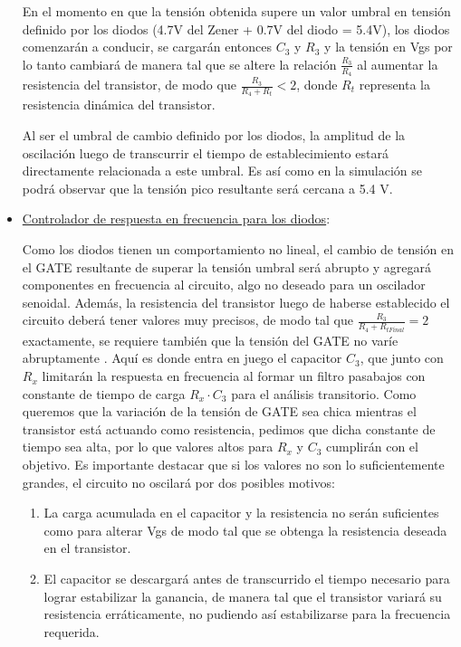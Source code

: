 \documentclass[../../tc_tp6_main.tex]{subfiles}
\begin{document}
\begin{itemize}
En el momento en que la tensión obtenida supere un valor umbral en tensión definido por los diodos (4.7V del Zener + 0.7V del diodo = 5.4V), los diodos comenzarán a conducir, se cargarán entonces $C_3$ y $R_3$ y la tensión en Vgs por lo tanto cambiará de manera tal que se altere la relación  $\frac{R_3}{R_4}$ al aumentar la resistencia del transistor, de modo que $\frac{R_3}{R_4+R_t}<2$, donde $R_t$ representa la resistencia dinámica del transistor.\par
Al ser el umbral de cambio definido por los diodos, la amplitud de la oscilación luego de transcurrir el tiempo de establecimiento estará directamente relacionada a este umbral. Es así como en la simulación se podrá observar que la tensión pico resultante será cercana a 5.4 V.\par

\item \underline{Controlador de respuesta en frecuencia para los diodos}:\par
Como los diodos tienen un comportamiento no lineal, el cambio de tensión en el GATE resultante de superar la tensión umbral será abrupto y agregará componentes en frecuencia al circuito, algo no deseado para un oscilador senoidal. Además, la resistencia del transistor luego de haberse establecido el circuito deberá tener valores muy precisos, de modo tal que $\frac{R_3}{R_4+R_{tFinal}}=2$ exactamente, se requiere también que la tensión del GATE no varíe abruptamente . Aquí es donde entra en juego el capacitor $C_3$, que junto con $R_x$ limitarán la respuesta en frecuencia al formar un filtro pasabajos con constante de tiempo de carga $R_x\cdot C_3$ para el análisis transitorio. Como queremos que la variación de la tensión de GATE sea chica mientras el transistor está actuando como resistencia, pedimos que dicha constante de tiempo sea alta, por lo que valores altos para $R_x$ y $C_3$ cumplirán con el objetivo. Es importante destacar que si los valores no son lo suficientemente grandes, el circuito no oscilará por dos posibles motivos: 
\begin{enumerate}
\item La carga acumulada en el capacitor y la resistencia no serán suficientes como para alterar Vgs de modo tal que se obtenga la resistencia deseada en el transistor.
\item El capacitor se descargará antes de transcurrido el tiempo necesario para lograr estabilizar la ganancia, de manera tal que el transistor variará su resistencia erráticamente, no pudiendo así estabilizarse para la frecuencia requerida.
\end{enumerate}
\end{itemize}
\end{document}
